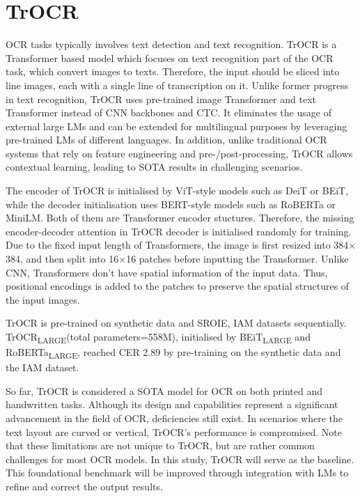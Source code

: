 \section{TrOCR}
\label{sec:2_trocr}
OCR tasks typically involves text detection and text recognition. TrOCR is a Transformer based model which focuses on text recognition part of the OCR task, which convert images to texts. Therefore, the input should be sliced into line images, each with a single line of transcription on it. Unlike former progress in text recognition, TrOCR uses pre-trained image Transformer and text Transformer instead of CNN backbones and CTC. It eliminates the usage of external large LMs and can be extended for multilingual purposes by leveraging pre-trained LMs of different languages. In addition, unlike traditional OCR systems that rely on feature engineering and pre-/post-processing, TrOCR allows contextual learning, leading to SOTA results in challenging scenarios.

The encoder of TrOCR is initialised by ViT-style models such as DeiT or BEiT, while the decoder initialisation uses BERT-style models such as RoBERTa or MiniLM. Both of them are Transformer encoder stuctures. Therefore, the missing encoder-decoder attention in TrOCR decoder is initialised randomly for training. Due to the fixed input length of Transformers, the image is first resized into 384$\times$384, and then split into 16$\times$16 patches before inputting the Transformer. Unlike CNN, Transformers don't have spatial information of the input data. Thus, positional encodings is added to the patches to preserve the spatial structures of the input images. 

TrOCR is pre-trained on synthetic data and SROIE, IAM datasets sequentially. TrOCR\textsubscript{LARGE}(total parameters=558M), initialised by BEiT\textsubscript{LARGE} and RoBERTa\textsubscript{LARGE}, reached CER 2.89 by pre-training on the synthetic data and the IAM dataset.

So far, TrOCR is considered a SOTA model for OCR on both printed and handwritten tasks. Although its design and capabilities represent a significant advancement in the field of OCR, deficiencies still exist. In scenarios where the text layout are curved or vertical, TrOCR's performance is compromised. Note that these limitations are not unique to TrOCR, but are rather common challenges for most OCR models. In this study, TrOCR will serve as the baseline. This foundational benchmark will be improved through integration with LMs to refine and correct the output results.

